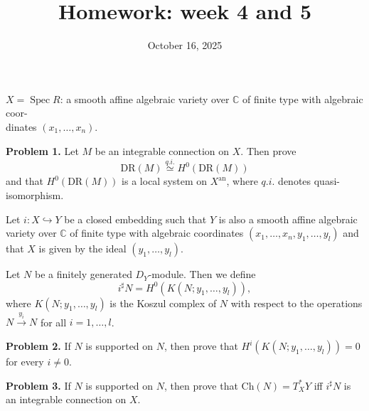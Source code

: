 \documentclass[12pt]{article}
\title{Homework: week 4 and 5}
\date{October 16, 2025}
\begin{document}
\maketitle

$X=\operatorname{Spec}R$: a smooth affine algebraic variety over $\mathbb{C}$ of finite type with algebraic coor-\\
dinates $(x_1,\ldots,x_n)$.

\bigskip
\noindent
\textbf{Problem 1.} Let $M$ be an integrable connection on $X$. Then prove
\[
\mathrm{DR}(M) \stackrel{q.i.}{\simeq} H^0(\mathrm{DR}(M))
\]
and that $H^0(\mathrm{DR}(M))$ is a local system on $X^{\mathrm{an}}$, where $q.i.$ denotes quasi-isomorphism.

\bigskip
Let $i:X\hookrightarrow Y$ be a closed embedding such that $Y$ is also a smooth affine algebraic
variety over $\mathbb{C}$ of finite type with algebraic coordinates $(x_1,\ldots,x_n,y_1,\ldots,y_l)$ and that $X$ is
given by the ideal $(y_1,\ldots,y_l)$.

Let $N$ be a finitely generated $D_Y$-module. Then we define
\[
 i^\sharp N = H^0(K(N;y_1,\ldots,y_l)),
\]
where $K(N;y_1,\ldots,y_l)$ is the Koszul complex of $N$ with respect to the operations $N \xrightarrow{y_i} N$
for all $i=1,\ldots,l$.

\bigskip
\noindent
\textbf{Problem 2.} If $N$ is supported on $N$, then prove that $H^i(K(N;y_1,\ldots,y_l))=0$ for every
$i\ne 0$.

\bigskip
\noindent
\textbf{Problem 3.} If $N$ is supported on $N$, then prove that $\mathrm{Ch}(N)=T_X^*Y$ iff $i^\sharp N$ is an integrable
connection on $X$.
\end{document}

